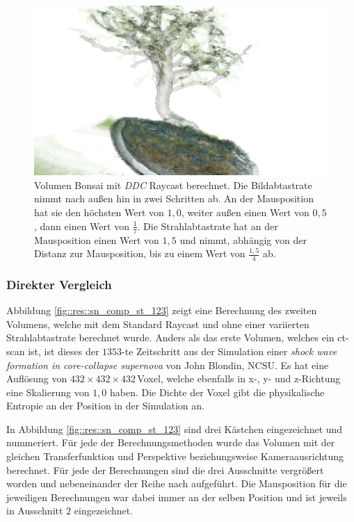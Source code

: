 \begin{landscape}
	\begin{figure}
		\centering
		\includegraphics[width=1\textheight]{../../Neue_Messungen/Bonsai/ddc_ors.png}
		\caption{Volumen Bonsai mit \emph{DDC} Raycast berechnet. Die Bildabtastrate nimmt nach außen hin in zwei Schritten ab. An der Mausposition hat sie den höchsten Wert von $1,0$, weiter außen einen Wert von $0,5$, dann einen Wert von $\frac{1}{7}$. Die Strahlabtastrate hat an der Mausposition einen Wert von $1,5$ und nimmt, abhängig von der Distanz zur Mausposition, bis zu einem Wert von $\frac{1,5}{4}$ ab.}
		\label{fig::res::bon_ddc_ors}
	\end{figure}
\end{landscape}

\subsubsection*{Direkter Vergleich}
Abbildung \ref{fig::res::sn_comp_st_123} zeigt eine Berechnung des zweiten Volumens, welche mit dem Standard Raycast und ohne einer variierten Strahlabtastrate berechnet wurde.
Anders als das erste Volumen, welches ein ct-scan ist, ist dieses der $1353$-te Zeitschritt aus der Simulation einer \emph{shock wave formation in core-collapse supernova} von John Blondin, NCSU.
Es hat eine Auflösung von $432\times432\times432$\,Voxel, welche ebenfalls in x-, y- und z-Richtung eine Skalierung von $1,0$ haben.
Die Dichte der Voxel gibt die physikalische Entropie an der Position in der Simulation an.

In Abbildung \ref{fig::res::sn_comp_st_123} sind drei Kästchen eingezeichnet und nummeriert.
Für jede der Berechnungsmethoden wurde das Volumen mit der gleichen Transferfunktion und Perspektive beziehungsweise Kameraausrichtung berechnet.
Für jede der Berechnungen sind die drei Ausschnitte vergrößert worden und nebeneinander der Reihe nach aufgeführt.
Die Mausposition für die jeweiligen Berechnungen war dabei immer an der selben Position und ist jeweils in Ausschnitt $2$ eingezeichnet.

